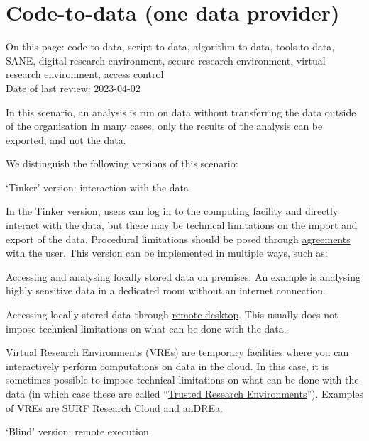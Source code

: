 \documentclass[
]{book}
\begin{document}
\hypertarget{code-to-data}{%
\section{Code-to-data (one data provider)}\label{code-to-data}}

On this page: code-to-data, script-to-data, algorithm-to-data, tools-to-data,
SANE, digital research environment, secure research environment, virtual
research environment, access control\\
Date of last review: 2023-04-02

In this scenario, an analysis is run on data without transferring the data
outside of the organisation In many cases, only the results of the analysis
can be exported, and not the data.

We distinguish the following versions of this scenario:

`Tinker' version: interaction with the data

In the Tinker version, users can log in to the computing facility and directly
interact with the data, but there may be technical limitations on the import and
export of the data. Procedural limitations should be posed through
\protect\hyperlink{agreements}{agreements} with the user. This version can be implemented in
multiple ways, such as:

Accessing and analysing locally stored data on premises. An example is
analysing highly sensitive data in a dedicated room without an internet
connection.

Accessing locally stored data through
\href{https://manuals.uu.nl/en/manual/solisworkspace-faq/}{remote desktop}.
This usually does not impose technical limitations on what can be done with
the data.

\href{https://www.uu.nl/en/research/research-data-management/tools-services/software-and-computing/virtual-research-environments}{Virtual Research Environments}
(VREs) are temporary facilities where you can interactively perform
computations on data in the cloud. In this case, it is sometimes possible to
impose technical limitations on what can be done with the data (in which case
these are called
``\href{https://the-turing-way.netlify.app/project-design/sdpw/trew.html}{Trusted Research Environments}'').
Examples of VREs are
\href{https://www.surf.nl/en/surf-research-cloud-collaboration-portal-for-research}{SURF Research Cloud}
and \href{https://www.andrea-cloud.eu/}{anDREa}.

`Blind' version: remote execution
\end{document}
